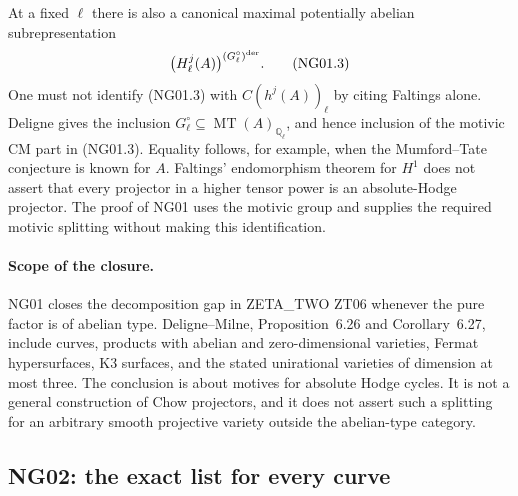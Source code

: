 \documentclass[11pt]{article}
\theoremstyle{remark}
\begin{document}
At a fixed $\ell$ there is also a canonical maximal potentially
abelian subrepresentation
\[
 \bigl(H^j_\ell(A)\bigr)^{(G_\ell^\circ)^{\rm der}}.           \tag{NG01.3}
\]
One must not identify (NG01.3) with $C(h^j(A))_\ell$ by citing
Faltings alone.  Deligne gives the inclusion
$G_\ell^\circ\subseteq\operatorname{MT}(A)_{\mathbb Q_\ell}$,
and hence inclusion of the motivic CM part in (NG01.3).
Equality follows, for example, when the Mumford--Tate conjecture is
known for $A$.  Faltings' endomorphism theorem for $H^1$ does not assert
that every projector in a higher tensor power is an absolute-Hodge
projector.  The proof of NG01 uses the motivic group and supplies the
required motivic splitting without making this identification.

\paragraph{Scope of the closure.}
NG01 closes the decomposition gap in ZETA\_TWO ZT06 whenever the pure
factor is of abelian type.  Deligne--Milne, Proposition~6.26 and
Corollary~6.27,
include curves, products with abelian and zero-dimensional varieties,
Fermat hypersurfaces, K3 surfaces, and the stated unirational varieties
of dimension at most three.  The conclusion is about motives for
absolute Hodge cycles.  It is not a general construction of Chow
projectors, and it does not assert such a splitting for an arbitrary
smooth projective variety outside the abelian-type category.

\subsection{NG02: the exact list for every curve}
\label{NG02}
\end{document}
